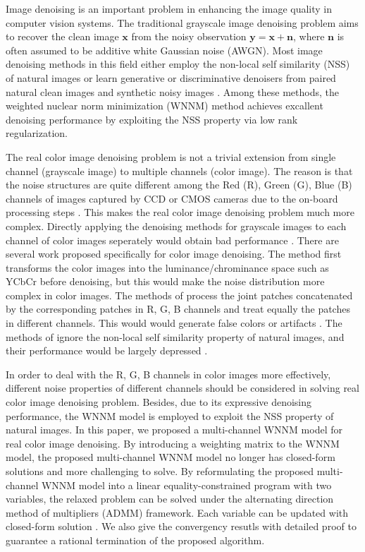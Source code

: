 \documentclass[10pt,twocolumn,letterpaper,sort&compress]{article}
\begin{document}
Image denoising is an important problem in enhancing the image quality in computer vision systems. The traditional grayscale image denoising problem aims to recover the clean image $\mathbf{x}$ from the noisy observation $\mathbf{y}=\mathbf{x}+\mathbf{n}$, where $\mathbf{n}$ is often assumed to be additive white Gaussian noise (AWGN). Most image denoising methods in this field either employ the non-local self similarity (NSS) of natural images \cite{nlm,bm3d,ksvd,lssc,ncsr,pgpd,wnnm} or learn generative or discriminative denoisers from paired natural clean images and synthetic noisy images \cite{foe,epll,mlp,csf,chen2015learning}. Among these methods, the weighted nuclear norm minimization (WNNM) method achieves excallent denoising performance by exploiting the NSS property via low rank regularization. 

The real color image denoising problem is not a trivial extension from single channel (grayscale image) to multiple channels (color image). The reason is that the noise structures are quite different among the Red (R), Green (G), Blue (B) channels of images captured by CCD or CMOS cameras due to the on-board processing steps \cite{karaimer_brown_ECCV_2016}. This makes the real color image denoising problem much more complex. Directly applying the denoising methods for grayscale images to each channel of color images seperately would obtain bad performance \cite{mairal2008sparse}. There are several work  \cite{cbm3d,mairal2008sparse,Liu2008,noiseclinic,crosschannel2016,Zhu_2016_CVPR} proposed specifically for color image denoising. The method \cite{cbm3d} first transforms the color images into the luminance/chrominance space such as YCbCr before denoising, but this would make the noise distribution more complex in color images. The methods of \cite{mairal2008sparse,Zhu_2016_CVPR} process the joint patches concatenated by the corresponding patches in R, G, B channels and treat equally the patches in different channels. This would would generate false colors or artifacts \cite{mairal2008sparse}. The methods of \cite{Liu2008,noiseclinic,crosschannel2016} ignore the non-local self similarity property of natural images, and their performance would be largely depressed \cite{bm3d,wnnm}.

In order to deal with the R, G, B channels in color images more effectively, different noise properties of different channels should be considered in solving real color image denoising problem. Besides, due to its expressive denoising performance, the WNNM model \cite{wnnm} is employed to exploit the NSS property of natural images. In this paper, we proposed a multi-channel WNNM model for real color image denoising. By introducing a weighting matrix to the WNNM model, the proposed multi-channel WNNM model no longer has closed-form solutions and more challenging to solve. By reformulating the proposed multi-channel WNNM model into a linear equality-constrained program with two variables, the relaxed problem can be solved under the alternating direction method of multipliers (ADMM) \cite{admm} framework. Each variable can be updated with closed-form solution \cite{wnnm,lugsvt}. We also give the convergency resutls with detailed proof to guarantee a rational termination of the proposed algorithm. 
\end{document}
